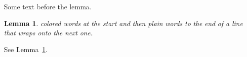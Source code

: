 \documentclass{article}
\newtheorem{lemma}{Lemma}
\begin{document}
Some text before the lemma.
\begin{lemma}\label{l:1} {\color{gray!60} colored words at the start} and then plain words to the end of a line that wraps
onto the next one.
\end{lemma}
See Lemma~\ref{l:1}.
\end{document}
